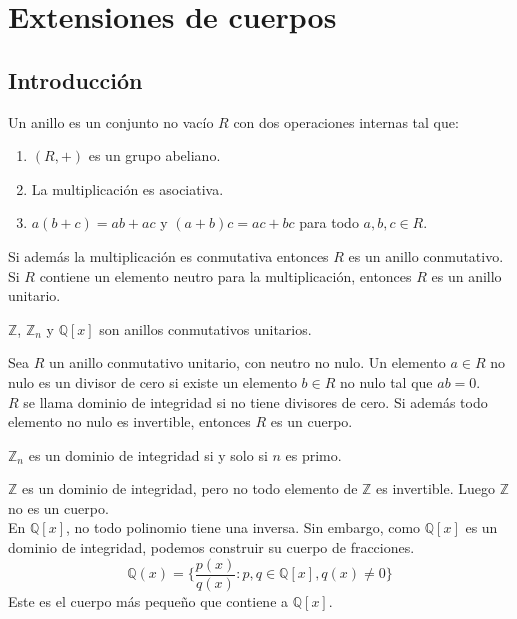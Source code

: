 \chapter{Extensiones de cuerpos}
\section{Introducción}

\begin{definition}
    Un anillo es un conjunto no vacío $R$ con dos operaciones internas tal que:
    \begin{enumerate}
        \item $(R, +)$ es un grupo abeliano.
        \item La multiplicación es asociativa.
        \item $a(b + c) = ab + ac$ y $(a + b)c = ac + bc$ para todo $a, b, c \in R$.
    \end{enumerate}
    Si además la multiplicación es conmutativa entonces $R$ es un anillo conmutativo.
    Si $R$ contiene un elemento neutro para la multiplicación, entonces $R$ es un anillo unitario.
\end{definition}

\begin{example}
    $\mathbb{Z}$, $\mathbb{Z}_n$ y $\mathbb{Q}[x]$ son anillos conmutativos unitarios.
\end{example}

\begin{definition}
    Sea $R$ un anillo conmutativo unitario, con neutro no nulo.
    Un elemento $a \in R$ no nulo es un divisor de cero si existe un elemento $b \in R$ no nulo tal que $ab = 0$.\\
    $R$ se llama dominio de integridad si no tiene divisores de cero.
    Si además todo elemento no nulo es invertible, entonces $R$ es un cuerpo.
\end{definition}

\begin{example}
    $\mathbb{Z}_n$ es un dominio de integridad si y solo si $n$ es primo.
\end{example}

\begin{example}
    $\mathbb{Z}$ es un dominio de integridad, pero no todo elemento de $\mathbb{Z}$ es invertible. Luego $\mathbb{Z}$ no es un cuerpo.\\
    En $\mathbb{Q}[x]$, no todo polinomio tiene una inversa. Sin embargo, como $\mathbb{Q}[x]$ es un dominio de integridad, podemos construir su cuerpo de fracciones.
    $$\mathbb{Q}(x) = \{ \frac{p(x)}{q(x)} : p, q \in \mathbb{Q}[x], q(x) \neq 0 \}$$
    Este es el cuerpo más pequeño que contiene a $\mathbb{Q}[x]$.
\end{example}


